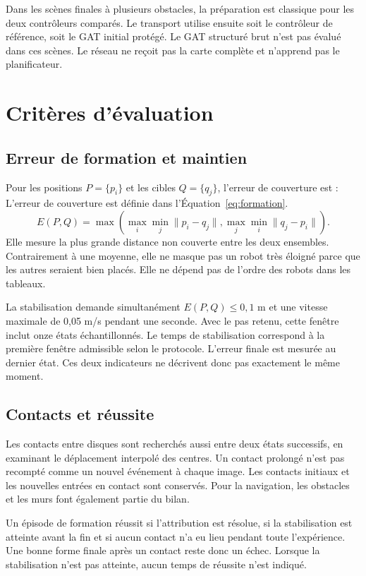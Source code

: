 Dans les scènes finales à plusieurs obstacles, la préparation est classique pour les deux contrôleurs comparés. Le transport utilise ensuite soit le contrôleur de référence, soit le GAT initial protégé. Le GAT structuré brut n'est pas évalué dans ces scènes. Le réseau ne reçoit pas la carte complète et n'apprend pas le planificateur.

\section{Critères d'évaluation}
\subsection{Erreur de formation et maintien}
Pour les positions $P=\{p_i\}$ et les cibles $Q=\{q_j\}$, l'erreur de couverture est :
L'erreur de couverture est définie dans l'Équation~\eqref{eq:formation}.
\begin{equation}
E(P,Q)=\max\left(\max_i\min_j\|p_i-q_j\|,
\max_j\min_i\|q_j-p_i\|\right).
\label{eq:formation}
\end{equation}
Elle mesure la plus grande distance non couverte entre les deux ensembles. Contrairement à une moyenne, elle ne masque pas un robot très éloigné parce que les autres seraient bien placés. Elle ne dépend pas de l'ordre des robots dans les tableaux.

La stabilisation demande simultanément $E(P,Q)\leq0{,}1$ m et une vitesse maximale de 0,05 m/s pendant une seconde. Avec le pas retenu, cette fenêtre inclut onze états échantillonnés. Le temps de stabilisation correspond à la première fenêtre admissible selon le protocole. L'erreur finale est mesurée au dernier état. Ces deux indicateurs ne décrivent donc pas exactement le même moment.

\subsection{Contacts et réussite}
Les contacts entre disques sont recherchés aussi entre deux états successifs, en examinant le déplacement interpolé des centres. Un contact prolongé n'est pas recompté comme un nouvel événement à chaque image. Les contacts initiaux et les nouvelles entrées en contact sont conservés. Pour la navigation, les obstacles et les murs font également partie du bilan.

Un épisode de formation réussit si l'attribution est résolue, si la stabilisation est atteinte avant la fin et si aucun contact n'a eu lieu pendant toute l'expérience. Une bonne forme finale après un contact reste donc un échec. Lorsque la stabilisation n'est pas atteinte, aucun temps de réussite n'est indiqué.

